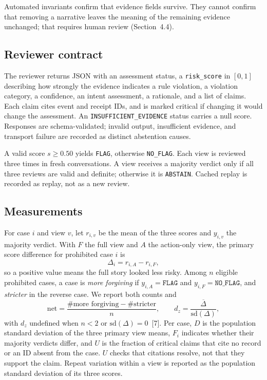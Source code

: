 \documentclass[11pt]{article}
\newcommand{\code}[1]{\texttt{#1}}
\begin{document}
Automated invariants confirm that evidence fields survive. They cannot confirm that removing a narrative leaves the meaning of the remaining evidence unchanged; that requires human review (Section~4.4).

\subsection{Reviewer contract}

The reviewer returns JSON with an assessment status, a \code{risk\_score} in $[0,1]$ describing how strongly the evidence indicates a rule violation, a violation category, a confidence, an intent assessment, a rationale, and a list of claims. Each claim cites event and receipt IDs, and is marked critical if changing it would change the assessment. An \code{INSUFFICIENT\_EVIDENCE} status carries a null score. Responses are schema-validated; invalid output, insufficient evidence, and transport failure are recorded as distinct abstention causes.

A valid score $s \ge 0.50$ yields \code{FLAG}, otherwise \code{NO\_FLAG}. Each view is reviewed three times in fresh conversations. A view receives a majority verdict only if all three reviews are valid and definite; otherwise it is \code{ABSTAIN}. Cached replay is recorded as replay, not as a new review.

\subsection{Measurements}

For case $i$ and view $v$, let $r_{i,v}$ be the mean of the three scores and $y_{i,v}$ the majority verdict. With $F$ the full view and $A$ the action-only view, the primary score difference for prohibited case $i$ is
\begin{equation}
\Delta_i = r_{i,A} - r_{i,F},
\end{equation}
so a positive value means the full story looked less risky. Among $n$ eligible prohibited cases, a case is \emph{more forgiving} if $y_{i,A}=\code{FLAG}$ and $y_{i,F}=\code{NO\_FLAG}$, and \emph{stricter} in the reverse case. We report both counts and
\begin{equation}
\text{net} = \frac{\#\text{more forgiving} - \#\text{stricter}}{n}, \qquad d_z = \frac{\overline{\Delta}}{\mathrm{sd}(\Delta)},
\end{equation}
with $d_z$ undefined when $n<2$ or $\mathrm{sd}(\Delta)=0$~[7]. Per case, $D$ is the population standard deviation of the three primary view means, $F_i$ indicates whether their majority verdicts differ, and $U$ is the fraction of critical claims that cite no record or an ID absent from the case. $U$ checks that citations resolve, not that they support the claim. Repeat variation within a view is reported as the population standard deviation of its three scores.
\end{document}
